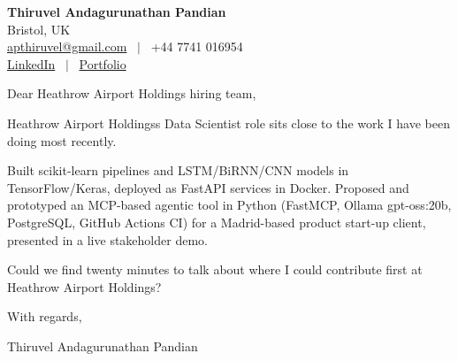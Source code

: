\documentclass[11pt,a4paper]{article}
\begin{document}
\raggedright
\pagestyle{empty}

\begin{center}
    {\LARGE \color{linkblue} \textbf{Thiruvel Andagurunathan Pandian}}\\[0.2cm]
    Bristol, UK \\
    \href{mailto:apthiruvel@gmail.com}{apthiruvel@gmail.com} \ $|$ \ +44 7741 016954 \\
\href{https://www.linkedin.com/in/thiruvel-a-p/}{LinkedIn} \ $|$ \ \href{https://thiruvel-ap.github.io/PersonalPortfolio/}{Portfolio}
\end{center}

\vspace{0.4cm}

\noindent
Dear Heathrow Airport Holdings hiring team,

Heathrow Airport Holdings\textquotesingle{}s Data Scientist role sits close to the work I have been doing most recently.

Built scikit-learn pipelines and LSTM/BiRNN/CNN models in TensorFlow/Keras, deployed as FastAPI services in Docker. Proposed and prototyped an MCP-based agentic tool in Python (FastMCP, Ollama gpt-oss:20b, PostgreSQL, GitHub Actions CI) for a Madrid-based product start-up client, presented in a live stakeholder demo.

Could we find twenty minutes to talk about where I could contribute first at Heathrow Airport Holdings?

\vspace{0.5cm}

With regards,

Thiruvel Andagurunathan Pandian
\end{document}
